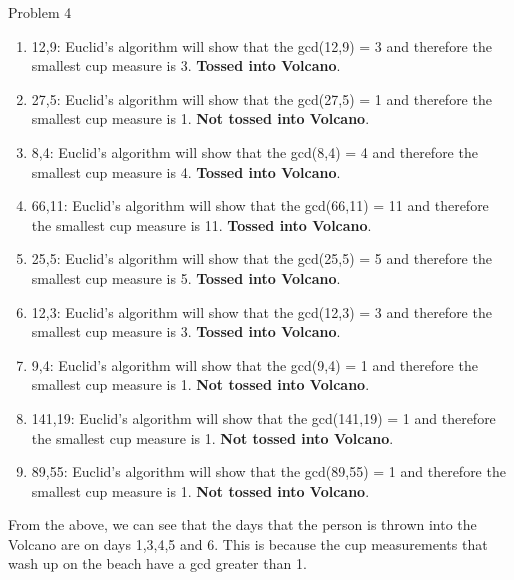 \begin{problem}{Problem 4}
    \begin{highlight}[Solution]
        \begin{enumerate}
            \item 12,9: Euclid's algorithm will show that the gcd(12,9) = 3 and therefore the smallest cup measure is 3. \textbf{Tossed into Volcano}.
            \item 27,5: Euclid's algorithm will show that the gcd(27,5) = 1 and therefore the smallest cup measure is 1. \textbf{Not tossed into Volcano}.
            \item 8,4: Euclid's algorithm will show that the gcd(8,4) = 4 and therefore the smallest cup measure is 4. \textbf{Tossed into Volcano}.
            \item 66,11: Euclid's algorithm will show that the gcd(66,11) = 11 and therefore the smallest cup measure is 11. \textbf{Tossed into Volcano}.
            \item 25,5: Euclid's algorithm will show that the gcd(25,5) = 5 and therefore the smallest cup measure is 5. \textbf{Tossed into Volcano}.
            \item 12,3: Euclid's algorithm will show that the gcd(12,3) = 3 and therefore the smallest cup measure is 3. \textbf{Tossed into Volcano}.
            \item 9,4: Euclid's algorithm will show that the gcd(9,4) = 1 and therefore the smallest cup measure is 1. \textbf{Not tossed into Volcano}.
            \item 141,19: Euclid's algorithm will show that the gcd(141,19) = 1 and therefore the smallest cup measure is 1. \textbf{Not tossed into Volcano}.
            \item 89,55: Euclid's algorithm will show that the gcd(89,55) = 1 and therefore the smallest cup measure is 1. \textbf{Not tossed into Volcano}.
        \end{enumerate}

        From the above, we can see that the days that the person is thrown into the Volcano are on days 1,3,4,5 and 6. This is because the cup measurements that wash up on the beach have a gcd greater
        than 1.
    \end{highlight}
\end{problem}

